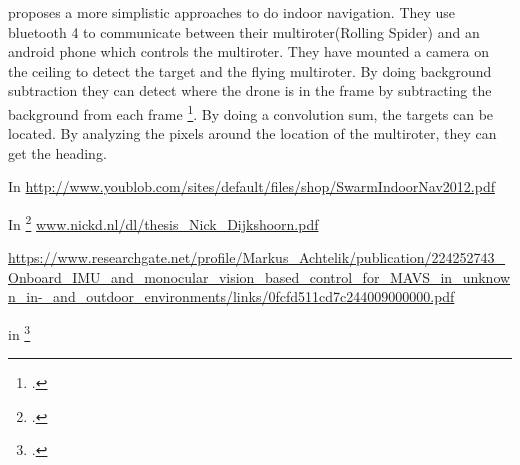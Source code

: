  
\cite{kang2015indoor} proposes a more simplistic approaches to do indoor navigation. They use bluetooth 4 to communicate between their multiroter(Rolling Spider) and an android phone which controls the multiroter. They have mounted a camera on the ceiling to detect the target and the flying multiroter. By doing background subtraction they can detect where the drone is in the frame by subtracting the background from each frame \footcite{wikiBackgroundsubtraction}. 
By doing a convolution sum, the targets can be located. By analyzing the pixels around the location of the multiroter, they can get the heading.

\cite{sanchez2014system}

\newpage
In \cite{stirling2012indoor} \url{http://www.youblob.com/sites/default/files/shop/SwarmIndoorNav2012.pdf}


In \footcite{dijkshoorn2012simultaneous} \url{www.nickd.nl/dl/thesis\_Nick\_Dijkshoorn.pdf}


\url{https://www.researchgate.net/profile/Markus_Achtelik/publication/224252743_Onboard_IMU_and_monocular_vision_based_control_for_MAVS_in_unknown_in-_and_outdoor_environments/links/0fcfd511cd7c244009000000.pdf}

in \footcite{stirling2012indoor}






